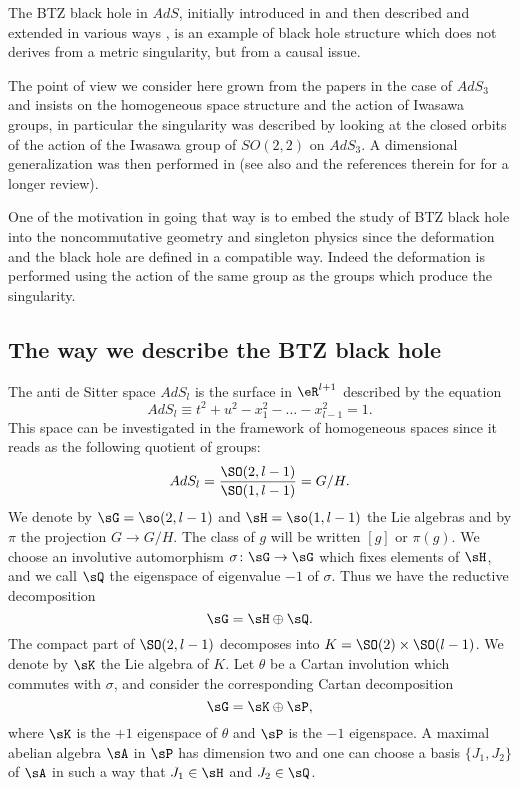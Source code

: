 The BTZ black hole in $AdS$, initially introduced in \cite{BTZ_un,BTZ_deux} and then described and extended in various ways \cite{HolstPeldan,Aminneborg,Madden}, is an example of black hole structure which does not derives from a metric singularity, but from a causal issue.

The point of view we consider here grown from the papers \cite{BTZB_deux,Keio} in the case of $AdS_3$ and insists on the homogeneous space structure and the action of Iwasawa groups, in particular the singularity was described by looking at the closed orbits of the action of the Iwasawa group of $SO(2,2)$ on $AdS_3$. A dimensional generalization was then performed in \cite{lcTNAdS} (see also \cite{These} and the references therein for for a longer review). 

One of the motivation in going that way is to embed the study of BTZ black hole into the noncommutative geometry and singleton physics \cite{BTZ_WZW,articleBVCS} since the deformation and the black hole are defined in a compatible way. Indeed the deformation is performed using the action of the same group as the groups which produce the singularity. 

%
\subsection{The way we describe the BTZ black hole}
%

The anti de Sitter space $AdS_l$ is the surface in $\eR^{l+1}$ described by the equation
\begin{equation}
	AdS_l\equiv t^2+u^2-x_1^2-\ldots-x_{l-1}^2=1.
\end{equation}
This space can be investigated in the framework of homogeneous spaces since it reads as the following quotient of groups:
\begin{equation}
	AdS_l=\frac{ \SO(2,l-1) }{ \SO(1,l-1) }=G/H.
\end{equation}
We denote by $\sG=\so(2,l-1)$ and $\sH=\so(1,l-1)$ the Lie algebras and by $\pi$ the projection $G\to G/H$. The class of $g$ will be written $[g]$ or $\pi(g)$. We choose an involutive automorphism $\sigma\colon \sG\to \sG$ which fixes elements of $\sH$, and we call $\sQ$ the eigenspace of eigenvalue $-1$ of $\sigma$. Thus we have the reductive decomposition
\begin{equation}		\label{LONGEqIntroRedDecompHQLieAlg}
	\sG=\sH\oplus\sQ.
\end{equation}
The compact part of $\SO(2,l-1)$ decomposes into $K=\SO(2)\times\SO(l-1)$. We denote by $\sK$ the Lie algebra of $K$. Let $\theta$ be a Cartan involution which commutes with $\sigma$, and consider the corresponding Cartan decomposition
\begin{equation}        \label{LONGEqIntroRedDecompKPLieAlg}
	\sG=\sK\oplus\sP,
\end{equation}
where $\sK$ is the $+1$ eigenspace of $\theta$ and $\sP$ is the $-1$ eigenspace. A maximal abelian algebra $\sA$ in $\sP$ has dimension two and one can choose a basis $\{ J_1,J_2 \}$ of $\sA$ in such a way that $J_1\in\sH$ and $J_2\in\sQ$.

